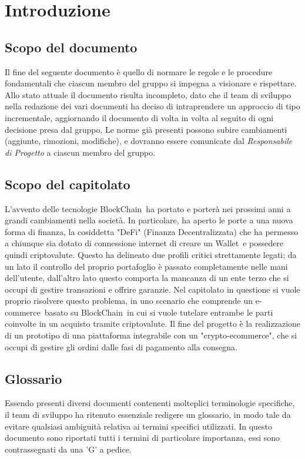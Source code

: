 \section{Introduzione} \label{section: introduzione}

\subsection {Scopo del documento}
Il fine del seguente documento è quello di normare le regole e le procedure fondamentali che ciascun membro del gruppo \groupName si impegna a visionare e rispettare.
Allo stato attuale il documento risulta incompleto, dato che il team di sviluppo nella redazione dei vari documenti ha deciso di intraprendere un approccio di tipo incrementale, aggiornando il documento di volta in volta al seguito di ogni decisione presa dal gruppo.
Le norme già presenti possono subire cambiamenti (aggiunte, rimozioni, modifiche), e dovranno essere comunicate dal \textit{Responsabile di Progetto} a ciascun membro del gruppo.

\subsection{Scopo del capitolato}
L'avvento delle tecnologie BlockChain\glo\ ha portato e porterà nei prossimi anni a grandi cambiamenti nella società. 
In particolare, ha aperto le porte a una nuova forma di finanza, la cosiddetta "DeFi" (Finanza Decentralizzata) che ha permesso a chiunque sia dotato di connessione internet di creare un Wallet\glo\ e possedere quindi criptovalute\glo.
Questo ha delineato due profili critici strettamente legati; da un lato il controllo del proprio portafoglio è passato completamente nelle mani dell'utente, dall'altro lato questo comporta la mancanza di un ente terzo che si occupi di gestire transazioni e offrire garanzie.
\newline
Nel capitolato in questione si vuole proprio risolvere questo problema, in uno scenario che comprende un e-commerce\glo\ basato su BlockChain\glo\ in cui si vuole tutelare entrambe le parti coinvolte in un acquisto tramite criptovalute.
\newline
Il fine del progetto è la realizzazione di un prototipo di una piattaforma integrabile con un "crypto-ecommerce\glo", che si occupi di gestire gli ordini dalle fasi di pagamento alla consegna.

\subsection{Glossario}
Essendo presenti diversi documenti contenenti molteplici terminologie specifiche, il team di sviluppo ha ritenuto essenziale redigere un glossario, in modo tale da evitare qualsiasi ambiguità relativa ai termini specifici utilizzati. 
In questo documento sono riportati tutti i termini di particolare importanza, essi sono contrassegnati da una 'G' a pedice.

